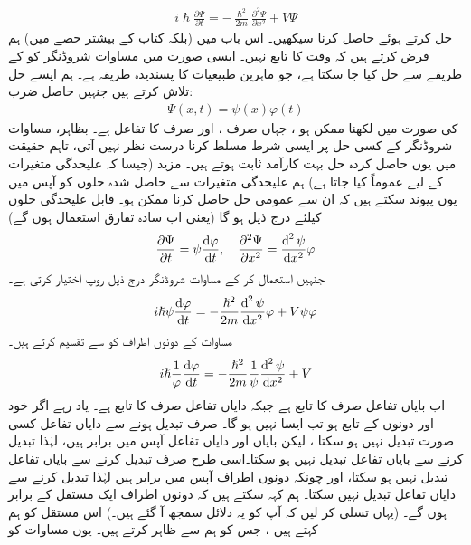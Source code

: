 \begin{align}\label{مساوات_شروڈنگر_تابع_وقت}
i \hslash \frac{\partial \Psi}{\partial t} = - \frac{\hslash^{2}}{2 m} \frac{\partial^{2} \Psi}{\partial x^{2}} + V\Psi
\end{align}
 حل کرتے ہوئے  حاصل کرنا سیکھیں۔ اس باب میں (بلکہ کتاب کے بیشتر حصے میں)  ہم فرض کرتے ہیں کہ  وقت  کا تابع نہیں۔ ایسی صورت میں مساوات شروڈنگر کو  کے طریقے سے حل کیا جا سکتا ہے، جو ماہرین طبیعیات کا پسندیدہ طریقہ ہے۔ ہم ایسے حل تلاش کرتے ہیں جنہیں حاصل ضرب:
\begin{align}
\Psi (x,t) = \psi (x) \varphi (t)
\end{align}
 کی صورت میں لکھنا ممکن ہو ، جہاں  صرف ،  اور  صرف  کا تفاعل ہے۔ بظاہر، مساوات شروڈنگر کے کسی حل پر ایسی شرط مسلط کرنا درست نظر نہیں آتی، تاہم حقیقت میں یوں حاصل کردہ حل بہت کارآمد ثابت ہوتے ہیں۔ مزید (جیسا کہ علیحدگی متغیرات کے لیے عموماً کیا جاتا ہے) ہم علیحدگی متغیرات سے حاصل شدہ حلوں کو  آپس میں  یوں  پیوند  سکتے ہیں کہ ان سے عمومی حل حاصل کرنا ممکن ہو۔ قابل علیحدگی حلوں کیلئے  درج ذیل ہو گا (یعنی اب سادہ تفارق  استعمال ہوں گے)
\begin{align*}
\frac{\partial \Psi}{\partial t} = \psi \frac{\dif \varphi}{\dif t}, \quad \frac{\partial^{2} \Psi}{\partial x^{2}} = \frac{\dif^{\,2} \psi}{\dif x^{2}} \varphi
\end{align*}
جنہیں استعمال کر کے  مساوات شروڈنگر درج ذیل روپ اختیار کرتی ہے۔
\begin{align*}
i \hslash \psi \frac{\dif \varphi}{\dif t} = - \frac{\hslash^{2}}{2m} \frac{\dif^{\,2} \psi}{\dif x^{2}} \varphi + V\psi\varphi
\end{align*}
مساوات کے دونوں اطراف کو  سے تقسیم کرتے ہیں۔
\begin{align}\label{مساوات_شروڈنگر_علاحدہ_الف}
i\hslash\frac{1}{\varphi} \frac{\dif \varphi}{\dif t} = - \frac{\hslash^{2}}{2m} \frac{1}{\psi} \frac{\dif^{\,2} \psi}{\dif x^{2}} + V
\end{align}
اب بایاں تفاعل صرف  کا تابع ہے جبکہ دایاں تفاعل صرف  کا تابع  ہے۔ یاد رہے اگر  خود  اور   دونوں کے تابع ہو تب ایسا نہیں ہو گا۔ صرف  تبدیل ہونے سے دایاں تفاعل کسی صورت تبدیل نہیں ہو سکتا ، لیکن  بایاں اور دایاں تفاعل   آپس میں برابر ہیں، لہٰذا    تبدیل کرنے سے بایاں تفاعل   تبدیل نہیں ہو سکتا۔اسی طرح صرف   تبدیل کرنے سے بایاں تفاعل تبدیل نہیں ہو سکتا،   اور چونکہ دونوں اطراف آپس میں  برابر ہیں لہٰذا    تبدیل کرنے سے دایاں تفاعل تبدیل نہیں سکتا۔ ہم کہہ سکتے ہیں کہ دونوں اطراف ایک مستقل کے برابر ہوں گے۔ (یہاں تسلی کر لیں کہ آپ کو یہ دلائل سمجھ آ گئے ہیں۔)  اس مستقل کو ہم  کہتے ہیں ، جس کو ہم  سے ظاہر کرتے ہیں۔ یوں مساوات  کو 
